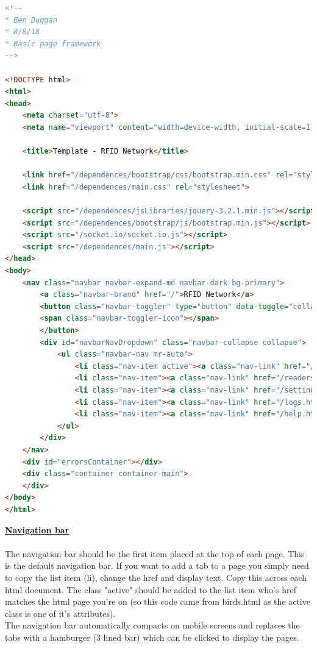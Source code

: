 \documentclass[12pt]{article}
\begin{document}
\begin{lstlisting}[language=html, caption="template.html", breaklines=true]
<!--
* Ben Duggan
* 8/8/18
* Basic page framework
-->

<!DOCTYPE html>
<html>
<head>
	<meta charset="utf-8">
	<meta name="viewport" content="width=device-width, initial-scale=1, shrink-to-fit=no">
	
	<title>Template - RFID Network</title>
	
	<link href="/dependences/bootstrap/css/bootstrap.min.css" rel="stylesheet">
	<link href="/dependences/main.css" rel="stylesheet">

	<script src="/dependences/jsLibraries/jquery-3.2.1.min.js"></script>
	<script src="/dependences/bootstrap/js/bootstrap.min.js"></script>
	<script src="/socket.io/socket.io.js"></script>
	<script src="/dependences/main.js"></script>
</head>
<body>
	<nav class="navbar navbar-expand-md navbar-dark bg-primary">
		<a class="navbar-brand" href="/">RFID Network</a>
		<button class="navbar-toggler" type="button" data-toggle="collapse" data-target="#navbarNavDropdown" aria-controls="navbarNavDropdown" aria-expanded="false" aria-label="Toggle navigation">
		<span class="navbar-toggler-icon"></span>
		</button>
		<div id="navbarNavDropdown" class="navbar-collapse collapse">
			<ul class="navbar-nav mr-auto">
				<li class="nav-item active"><a class="nav-link" href="/birds.html">Birds</a></li>
				<li class="nav-item"><a class="nav-link" href="/readers.html">Reader</a></li>
				<li class="nav-item"><a class="nav-link" href="/settings.html">Settings</a></li>
				<li class="nav-item"><a class="nav-link" href="/logs.html">Logs</a></li>
				<li class="nav-item"><a class="nav-link" href="/help.html">Help</a></li>
			</ul>
		</div>
	</nav>
	<div id="errorsContainer"></div>
	<div class="container container-main">
	</div>
</body>
</html>
\end{lstlisting}


\underline{\textbf{Navigation bar}}\\\\
The navigation bar should be the first item placed at the top of each page.  This is the default navigation bar.  If you want to add a tab to a page you simply need to copy the list item (li), change the href and display text.  Copy this across each html document.  The class "active" should be added to the list item who's href matches the html page you're on (so this code came from birds.html as the active class is one of it's attributes).\\  The navigation bar automatically compacts on mobile screens and replaces the tabs with a hamburger (3 lined bar) which can be clicked to display the pages.
\end{document}
